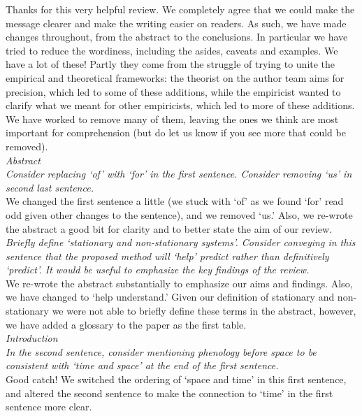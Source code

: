 \documentclass[11pt]{article}
\begin{document}
Thanks for this very helpful review. We completely agree that we could make the message clearer and make the writing easier on readers. As such, we have made changes throughout, from the abstract to the conclusions. In particular we have tried to reduce the wordiness, including the asides, caveats and examples. We have a lot of these! Partly they come from the struggle of trying to unite the empirical and theoretical frameworks: the theorist on the author team aims for precision, which led to some of these additions, while the empiricist wanted to clarify what we meant for other empiricists, which led to more of these additions. We have worked to remove many of them, leaving the ones we think are most important for comprehension (but do let us know if you see more that could be removed).  \\

\emph{ Abstract\\
Consider replacing `of' with `for' in the first sentence. Consider removing `us' in second
last sentence.}\\

We changed the first sentence a little (we stuck with `of' as we found `for' read odd given other changes to the sentence), and we removed `us.' Also, we re-wrote the abstract a good bit for clarity and to better state the aim of our review. \\

\emph{Briefly define `stationary and non-stationary systems'. Consider conveying in this sentence
that the proposed method will `help' predict rather than definitively `predict'. It would be
useful to emphasize the key findings of the review.}\\

We re-wrote the abstract substantially to emphasize our aims and findings. Also, we have changed to `help understand.' Given our definition of stationary and non-stationary we were not able to briefly define these terms in the abstract, however, we have added a glossary to the paper as the first table. \\

\emph{Introduction\\
In the second sentence, consider mentioning phenology before space to be consistent with
`time and space' at the end of the first sentence.}\\

Good catch! We switched the ordering of `space and time' in this first sentence, and altered the second sentence to make the connection to `time' in the first sentence more clear.\\
\end{document}

